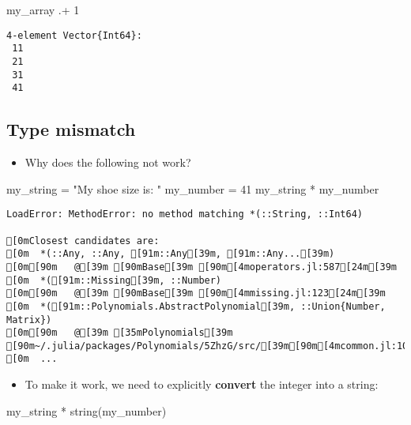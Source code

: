 \documentclass[
  letterpaper,
  DIV=11,
  numbers=noendperiod]{scrartcl}
\newenvironment{Shaded}{\begin{snugshade}}{\end{snugshade}}
\newcommand{\FloatTok}[1]{\textcolor[rgb]{0.68,0.00,0.00}{#1}}
\newcommand{\FunctionTok}[1]{\textcolor[rgb]{0.28,0.35,0.67}{#1}}
\newcommand{\NormalTok}[1]{\textcolor[rgb]{0.00,0.23,0.31}{#1}}
\newcommand{\OperatorTok}[1]{\textcolor[rgb]{0.37,0.37,0.37}{#1}}
\newcommand{\StringTok}[1]{\textcolor[rgb]{0.13,0.47,0.30}{#1}}
\providecommand{\tightlist}{%
  \setlength{\itemsep}{0pt}\setlength{\parskip}{0pt}}\usepackage{longtable,booktabs,array}
\begin{document}
\begin{Shaded}
\begin{Highlighting}[]
\NormalTok{my\_array }\OperatorTok{.+} \FloatTok{1}
\end{Highlighting}
\end{Shaded}

\begin{verbatim}
4-element Vector{Int64}:
 11
 21
 31
 41
\end{verbatim}

\subsection{Type mismatch}\label{type-mismatch}

\begin{itemize}
\tightlist
\item
  Why does the following not work?
\end{itemize}

\begin{Shaded}
\begin{Highlighting}[]
\NormalTok{my\_string }\OperatorTok{=} \StringTok{"My shoe size is: "}
\NormalTok{my\_number }\OperatorTok{=} \FloatTok{41}
\NormalTok{my\_string }\OperatorTok{*}\NormalTok{ my\_number}
\end{Highlighting}
\end{Shaded}

\begin{verbatim}
LoadError: MethodError: no method matching *(::String, ::Int64)

[0mClosest candidates are:
[0m  *(::Any, ::Any, [91m::Any[39m, [91m::Any...[39m)
[0m[90m   @[39m [90mBase[39m [90m[4moperators.jl:587[24m[39m
[0m  *([91m::Missing[39m, ::Number)
[0m[90m   @[39m [90mBase[39m [90m[4mmissing.jl:123[24m[39m
[0m  *([91m::Polynomials.AbstractPolynomial[39m, ::Union{Number, Matrix})
[0m[90m   @[39m [35mPolynomials[39m [90m~/.julia/packages/Polynomials/5ZhzG/src/[39m[90m[4mcommon.jl:1041[24m[39m
[0m  ...
\end{verbatim}

\begin{itemize}
\tightlist
\item
  To make it work, we need to explicitly \textbf{convert} the integer
  into a string:
\end{itemize}

\begin{Shaded}
\begin{Highlighting}[]
\NormalTok{my\_string }\OperatorTok{*} \FunctionTok{string}\NormalTok{(my\_number)}
\end{Highlighting}
\end{Shaded}
\end{document}
